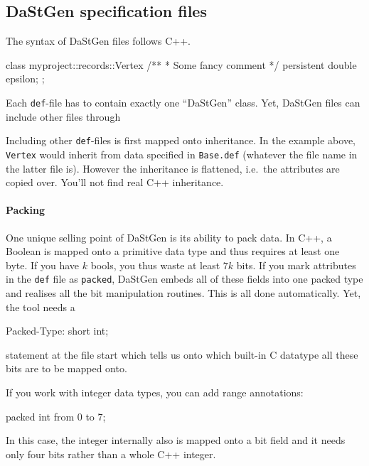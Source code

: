 \subsection{DaStGen specification files}

The syntax of DaStGen files follows C++.
\begin{code}
class myproject::records::Vertex {  
  /**
   * Some fancy comment
   */
  persistent double   epsilon;
};
\end{code}

\noindent
Each \texttt{def}-file has to contain exactly one ``DaStGen'' class.
Yet, DaStGen files can include other files through 
\begin{code}
  
\end{code}


\noindent
Including other \texttt{def}-files is first mapped onto inheritance.
In the example above, \texttt{Vertex} would inherit from data specified in
\texttt{Base.def} (whatever the file name in the latter file is).
However the inheritance is flattened, i.e.~the attributes are copied over.
You'll not find real C++ inheritance.


\paragraph{Packing}

One unique selling point of DaStGen is its ability to pack data.
In C++, a Boolean is mapped onto a primitive data type and thus requires at
least one byte.
If you have $k$ bools, you thus waste at least $7k$ bits.
If you mark attributes in the \texttt{def} file as \texttt{packed}, DaStGen
embeds all of these fields into one packed type and realises all the bit
manipulation routines. 
This is all done automatically. 
Yet, the tool needs a 
\begin{code}
Packed-Type: short int;
\end{code}

\noindent
statement at the file start which tells us onto which built-in C datatype all
these bits are to be mapped onto.


If you work with integer data types, you can add range annotations:
\begin{code}
packed int from 0 to 7;
\end{code}

\noindent
In this case, the integer internally also is mapped onto a bit field and it
needs only four bits rather than a whole C++ integer.


